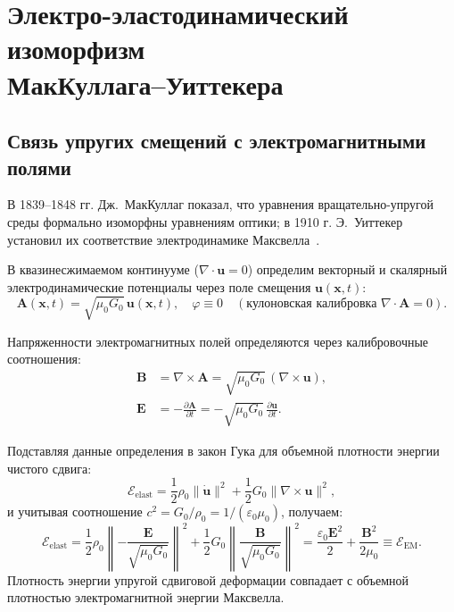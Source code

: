 \documentclass[11pt,a4paper]{article}
\theoremstyle{definition}
\theoremstyle{remark}
\begin{document}
\section{Электро-эластодинамический изоморфизм\\ МакКуллага--Уиттекера}
	
\subsection{Связь упругих смещений с электромагнитными полями}
	
В 1839--1848 гг. Дж.~МакКуллаг показал, что уравнения вращательно-упругой среды формально изоморфны уравнениям оптики; в 1910 г. Э.~Уиттекер установил их соответствие электродинамике Максвелла~\cite{MacCullagh1848,Whittaker1910}.
	
В квазинесжимаемом континууме ($\nabla \cdot \mathbf{u} = 0$) определим векторный и скалярный электродинамические потенциалы через поле смещения $\mathbf{u}(\mathbf{x}, t)$:
\begin{equation}
	\mathbf{A}(\mathbf{x}, t) = \sqrt{\mu_0 G_0} \, \mathbf{u}(\mathbf{x}, t), \quad \varphi \equiv 0 \quad (\text{кулоновская калибровка } \nabla \cdot \mathbf{A} = 0).
	\label{eq:potentials_def}
	\end{equation}
	
Напряженности электромагнитных полей определяются через калибровочные соотношения:
\begin{align}
\mathbf{B} &= \nabla \times \mathbf{A} = \sqrt{\mu_0 G_0} \, (\nabla \times \mathbf{u}), \label{eq:field_B_def} \\
\mathbf{E} &= -\frac{\partial \mathbf{A}}{\partial t} = -\sqrt{\mu_0 G_0} \, \frac{\partial \mathbf{u}}{\partial t}. \label{eq:field_E_def}
\end{align}
	
Подставляя данные определения в закон Гука для объемной плотности энергии чистого сдвига:
\begin{equation}
	\mathcal{E}_{\mathrm{elast}} = \frac{1}{2} \rho_0 \|\dot{\mathbf{u}}\|^2 + \frac{1}{2} G_0 \|\nabla \times \mathbf{u}\|^2,
	\label{eq:elastic_energy_density_raw}
\end{equation}
и учитывая соотношение $c^2 = G_0 / \rho_0 = 1/(\varepsilon_0 \mu_0)$, получаем:
\begin{equation}
	\mathcal{E}_{\mathrm{elast}} = \frac{1}{2} \rho_0 \left\| -\frac{\mathbf{E}}{\sqrt{\mu_0 G_0}} \right\|^2 + \frac{1}{2} G_0 \left\| \frac{\mathbf{B}}{\sqrt{\mu_0 G_0}} \right\|^2 = \frac{\varepsilon_0 \mathbf{E}^2}{2} + \frac{\mathbf{B}^2}{2\mu_0} \equiv \mathcal{E}_{\mathrm{EM}}.
	\label{eq:em_energy_density_match}
\end{equation}
Плотность энергии упругой сдвиговой деформации совпадает с объемной плотностью электромагнитной энергии Максвелла.
	
\end{document}
